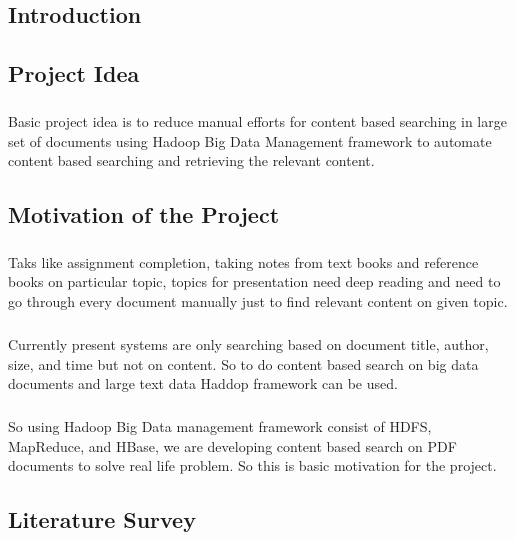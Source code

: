 \documentclass[oneside,a4paper,12pt]{report}
\begin{document}
\begin{center}
\chapter{Introduction}
\newpage
\end{center}
\section{Project Idea}
\paragraph{}
Basic project idea is to reduce manual efforts for content based searching in large set of documents using Hadoop Big Data Management framework to automate content based searching and retrieving the relevant content. 
\section{Motivation of the Project}
\paragraph{}
Taks like assignment completion, taking notes from text books and reference books on particular topic, topics for presentation need deep reading and need to go through every document manually just to find relevant content on given topic.
\paragraph{}
Currently present systems are only searching based on document title, author, size, and time but not on content. So to do content based search on big data documents and large text data Haddop framework can be used.
\paragraph{}
So using Hadoop Big Data management framework consist of HDFS, MapReduce, and HBase, we are developing content based search on PDF documents to solve real life problem. So this is basic motivation for the project.
\section{Literature Survey}
\end{document}
